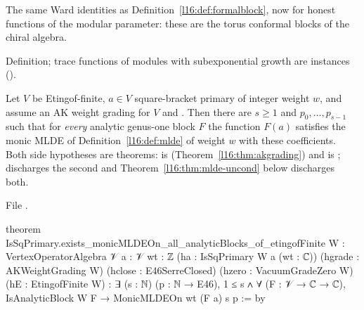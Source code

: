 \begin{physics}
The same Ward identities as Definition~\ref{l16:def:formalblock}, now for honest functions of the modular parameter: these
are the torus conformal blocks of the chiral algebra.
\end{physics}

\begin{status}
Definition; trace functions of modules with subexponential growth are instances (\allowbreak{}).
\end{status}

\begin{theorem}\label{l16:thm:mlde}
Let $V$ be Etingof-finite, $a\in V$ square-bracket primary of integer weight $w$, and assume an AK weight grading for $V$
and . Then there are $s\ge1$ and $p_0,\dots,p_{s-1}$ such that for \emph{every} analytic genus-one
block $F$ the function $F(a)$ satisfies the monic MLDE of Definition~\ref{l16:def:mlde} of weight $w$ with these
coefficients. Both side hypotheses are theorems:  is 
(Theorem~\ref{l16:thm:akgrading}) and  is ;
\allowbreak{}\allowbreak{}\allowbreak{}\allowbreak{}
discharges the second and Theorem~\ref{l16:thm:mlde-uncond} below discharges both.
\end{theorem}
\noindent File .
\begin{leancode}
theorem IsSqPrimary.exists_monicMLDEOn_all_analyticBlocks_of_etingofFinite
    {W : VertexOperatorAlgebra 𝒱} {a : 𝒱} {wt : ℤ}
    (ha : IsSqPrimary W a (wt : ℂ)) (hgrade : AKWeightGrading W)
    (hclose : E46SerreClosed) (hzero : VacuumGradeZero W) (hE : EtingofFinite W) :
    ∃ (s : ℕ) (p : ℕ → E46), 1 ≤ s ∧
      ∀ (F : 𝒱 → ℂ → ℂ), IsAnalyticBlock W F → MonicMLDEOn wt (F a) s p := by
\end{leancode}

